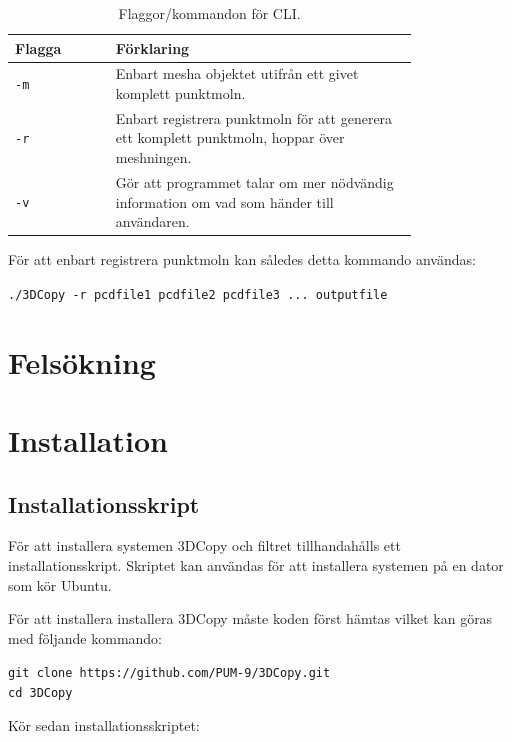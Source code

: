 \documentclass[a4paper,titlepage,12pt]{article}
\begin{document}
		\begin{table}[h!]
			\centering
			\caption{Flaggor/kommandon för CLI.}
			\label{tab:flaggor_cli}
			
			\begin{tabular}{p{0.2\linewidth}p{0.6\linewidth}}
				Flagga & Förklaring \\
				\hline
				\texttt{-m} & Enbart mesha objektet utifrån ett givet komplett punktmoln. \\
				\hline
				\texttt{-r} & Enbart registrera punktmoln för att generera ett komplett punktmoln, hoppar över meshningen. \\
				\hline
				\texttt{-v} & Gör att programmet talar om mer nödvändig information om vad som händer till användaren. \\
				\hline
			\end{tabular}
		\end{table}	
		
		För att enbart registrera punktmoln kan således detta kommando användas:
		
		\texttt{./3DCopy -r pcdfile1 pcdfile2 pcdfile3 ... outputfile}
\newpage
    
\section{Felsökning}
\newpage
    
\section{Installation}
\subsection{Installationsskript}
	För att installera systemen 3DCopy och filtret tillhandahålls ett installationsskript. Skriptet kan användas för att installera systemen på en dator som kör Ubuntu.
	
	För att installera installera 3DCopy måste koden först hämtas vilket kan göras med följande kommando:
	
	\texttt{git clone https://github.com/PUM-9/3DCopy.git \\
	cd 3DCopy}
	
	Kör sedan installationsskriptet:
	
\end{document}
